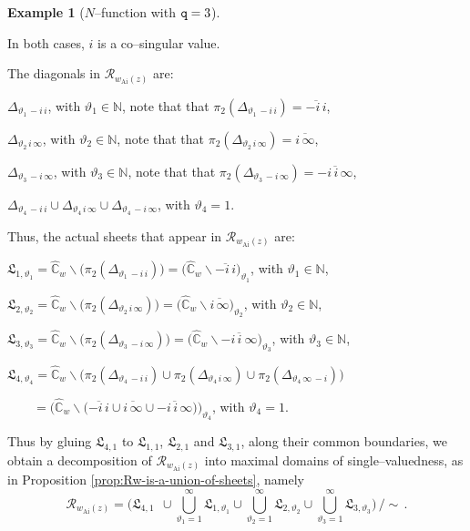 \documentclass[final,3p,times]{elsarticle}
\newcommand{\CW}{\ensuremath{{\widehat{\mathbb C}}}}
\newcommand{\NN}{\ensuremath{{\mathbb N}}}
\newcommand{\R}{\ensuremath{{\mathcal R}}}
\newcommand{\Ai}{{\text{Ai}}}
\theoremstyle{definition}
\newtheorem{example}{Example}[section]
\begin{document}
\begin{example}[$N$--function with ${\tt q}=3$]
\begin{enumerate}[label=\alph*),leftmargin=*]
\noindent
In both cases, $i$ is a co--singular value.

\noindent
The diagonals in $\R_{w_{\Ai}(z)}$ are: 

$\Delta_{\vartheta_1 \, -i \,  i}$, with $\vartheta_1 \in \NN$,
note that that $\pi_2 (\Delta_{\vartheta_1 \, -i \, i} ) = \overline{-i \, i}$,

$\Delta_{\vartheta_2 \,  i \, \infty}$, with $\vartheta_2 \in \NN$,
note that that $\pi_2 (\Delta_{\vartheta_2 \, i \, \infty} ) = \overline{i \, \infty}$,

$\Delta_{\vartheta_3 \, -i\, \infty }$, with $\vartheta_3 \in \NN$,
note that that $\pi_2 (\Delta_{\vartheta_3 \, -i\, \infty } ) = \overline{-i\, i\, \infty }$,

$\Delta_{\vartheta_4 \, -i \, i}  \cup 
\Delta_{\vartheta_4 \, i \, \infty}  \cup
\Delta_{\vartheta_4 \, -i \, \infty } $, with $\vartheta_4=1$.

\noindent
Thus, the actual sheets that appear in $\R_{w_{\Ai}(z)}$ are:

$\mathfrak{L}_{1,\vartheta_1} = \CW_w \backslash \big( \pi_2 (\Delta_{\vartheta_1 \, -i \, i} ) \big)
= \big( \CW_w \backslash  \overline{-i \, i} \big)_{\vartheta_1}$,
with $\vartheta_1\in\NN$,

$\mathfrak{L}_{2,\vartheta_2} = \CW_w \backslash \big( \pi_2 (\Delta_{\vartheta_2 \, i \, \infty} ) \big)
= \big( \CW_w \backslash  \overline{i \, \infty} \big)_{\vartheta_2}$,
with $\vartheta_2\in\NN$,

$\mathfrak{L}_{3,\vartheta_3} = \CW_w \backslash \big( \pi_2 (\Delta_{\vartheta_3 \, -i\, \infty } ) \big)
= \big( \CW_w \backslash  \overline{-i\, i\ \infty } \big)_{\vartheta_3}$,
with $\vartheta_3\in\NN$,

$\mathfrak{L}_{4,\vartheta_4} = \CW_w \backslash 
\big( 
\pi_2 (\Delta_{\vartheta_4 \, -i \, i} ) \cup 
\pi_2 (\Delta_{\vartheta_4 \, i \, \infty} ) \cup
\pi_2 (\Delta_{\vartheta_4  \, \infty \, -i} ) 
\big)
$

$
\quad \quad  =\Big( \CW_w \backslash 
\big( \overline{-i \, i} \cup  \overline{i \, \infty} \cup 
\overline{-i\, i\, \infty } \big) \Big)_{\vartheta_4}
$, 
with $\vartheta_4=1$.

\noindent
Thus by gluing $\mathfrak{L}_{4,1}$ to $\mathfrak{L}_{1,1}$,
$\mathfrak{L}_{2,1}$ and $\mathfrak{L}_{3,1}$, along their common boundaries, 
we obtain a
decomposition of $\R_{w_{\Ai}(z)}$ into maximal domains of 
single--valuedness,
as in Proposition \ref{prop:Rw-is-a-union-of-sheets},
namely
\begin{equation}
\label{eq:decomposicion-dominios-maximales-Ai}
\R_{w_{\Ai}(z)} = 
\Bigg(
\mathfrak{L}_{4,1} 
\ \ \cup
\bigcup_{\vartheta_1= 1}^\infty 
\mathfrak{L}_{1, \vartheta_1}
\cup
\bigcup_{\vartheta_2= 1}^\infty 
\mathfrak{L}_{2, \vartheta_2 }
\cup
\bigcup_{\vartheta_3= 1}^\infty 
\mathfrak{L}_{3, \vartheta_3 }
\Bigg) \, \Big/ \sim \, .
\end{equation}


\end{enumerate}
\end{example}
\end{document}
